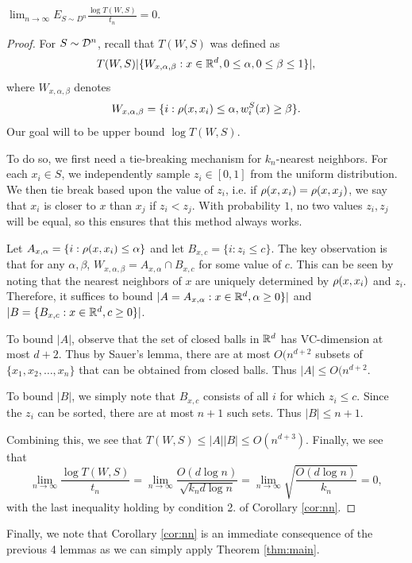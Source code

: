 \begin{lem}
$\lim_{n \to \infty} E_{S \sim D^n}\frac{\log T(W,S)}{t_n} = 0$.
\end{lem}

\begin{proof}
For $S \sim {\mathcal D}^n$, recall that $T(W, S)$ was defined as $$T(W, S) |\{W_{x, \alpha, \beta}: x \in \mathbb R^d, 0 \leq \alpha, 0 \leq \beta \leq 1\}|,$$ where $W_{x, \alpha, \beta}$ denotes $$W_{x, \alpha, \beta} = \{i: \rho(x, x_i) \leq \alpha, w_i^S(x) \geq \beta\}.$$ Our goal will to be upper bound $\log T(W, S)$. 

To do so, we first need a tie-breaking mechanism for $k_n$-nearest neighbors. For each $x_i \in S$, we independently sample $z_i \in [0, 1]$ from the uniform distribution. We then tie break based upon the value of $z_i$, i.e. if $\rho(x, x_i) = \rho(x, x_j)$, we say that $x_i$ is closer to $x$ than $x_j$ if $z_i < z_j$. With probability $1$, no two values $z_i ,z_j$ will be equal, so this ensures that this method always works.

Let $A_{x, \alpha} = \{i: \rho(x, x_i) \leq \alpha\}$ and let $B_{x, c} = \{i: z_i \leq c\}.$ The key observation is that for any $\alpha, \beta$, $W_{x, \alpha, \beta} = A_{x, \alpha} \cap B_{x, c}$ for some value of $c$. This can be seen by noting that the nearest neighbors of $x$ are uniquely determined by $\rho(x, x_i)$ and $z_i$. Therefore, it suffices to bound $|A = A_{x, \alpha}: x \in \mathbb R^d, \alpha \geq 0\}|$ and $|B = \{B_{x, c}: x \in \mathbb R^d, c \geq 0\}|$. 

To bound $|A|$, observe that the set of closed balls in $\mathbb R^d$ has VC-dimension at most $d+2$. Thus by Sauer's lemma, there are at most $O(n^{d+2}$ subsets of $\{x_1, x_2, \dots, x_n\}$ that can be obtained from closed balls. Thus $|A| \leq O(n^{d+2}$. 

To bound $|B|$, we simply note that $B_{x, c}$ consists of all $i$ for which $z_i \leq c$. Since the $z_i$ can be sorted, there are at most $n+1$ such sets. Thus $|B| \leq n+1$.

Combining this, we see that $T(W, S) \leq |A||B| \leq O(n^{d+3})$. Finally, we see that $$\lim_{n \to \infty} \frac{\log T(W,S)}{t_n} = \lim_{n \to \infty} \frac{O(d\log n)}{\sqrt{k_n d \log n}} = \lim_{n \to \infty} \sqrt{\frac{O(d \log n)}{k_n}} = 0,$$ with the last inequality holding by condition 2. of Corollary \ref{cor:nn}. 

\end{proof}


Finally, we note that Corollary \ref{cor:nn} is an immediate consequence of the previous 4 lemmas as we can simply apply Theorem \ref{thm:main}.

